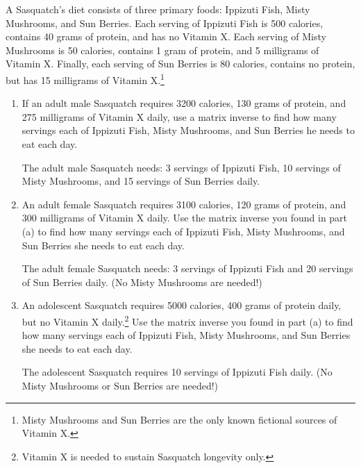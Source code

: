 \documentclass{ximera}
\begin{document}
\begin{problem}\label{SasquatchDiet}
A Sasquatch's diet consists of three primary foods:  Ippizuti Fish, Misty Mushrooms, and Sun Berries.  Each serving of Ippizuti Fish is 500 calories, contains 40 grams of protein, and has no Vitamin X.  Each serving of Misty Mushrooms is 50 calories, contains 1 gram of protein, and 5 milligrams of Vitamin X.  Finally, each serving of Sun Berries is 80 calories, contains no protein, but has 15 milligrams of Vitamin X.\footnote{Misty Mushrooms and Sun Berries are the only known fictional sources of Vitamin X.}

\begin{enumerate}

\item  If an adult male Sasquatch requires 3200 calories, 130 grams of protein, and 275 milligrams of Vitamin X daily, use a matrix inverse to find how many servings each of Ippizuti Fish, Misty Mushrooms, and Sun Berries he needs to eat each day.

\begin{solution}
The adult male Sasquatch needs:  3 servings of Ippizuti Fish, 10 servings of Misty Mushrooms, and 15 servings of Sun Berries daily.
\end{solution}

\item  An adult female Sasquatch requires 3100 calories, 120 grams of protein, and 300 milligrams of Vitamin X daily. Use the matrix inverse you found in part (a) to find how many servings each of Ippizuti Fish, Misty Mushrooms, and Sun Berries she needs to eat each day.

\begin{solution}
The adult female Sasquatch needs:  3 servings of Ippizuti Fish and 20 servings of Sun Berries daily.  (No Misty Mushrooms are needed!)
\end{solution}

\item  An adolescent Sasquatch requires 5000 calories, 400 grams of protein daily, but no Vitamin X daily.\footnote{Vitamin X is needed to sustain Sasquatch longevity only.}   Use the matrix inverse you found in part (a) to find how many servings each of Ippizuti Fish, Misty Mushrooms, and Sun Berries she needs to eat each day.

\begin{solution}
The adolescent Sasquatch requires 10 servings of Ippizuti Fish daily.  (No Misty Mushrooms or Sun Berries are needed!)
\end{solution}

\end{enumerate}
\end{problem}
 
\end{document}
